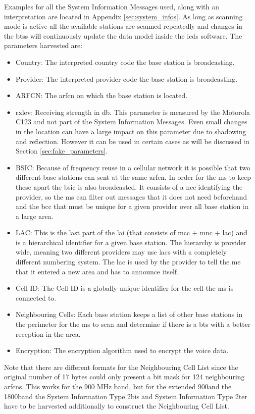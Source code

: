 Examples for all the System Information Messages used, along with an interpretation are located in Appendix \ref{sec:system_infos}.
As long as scanning mode is active all the available stations are scanned repeatedly and changes in the \glspl{bts} will continuously update the data model inside the \gls{icds} software.
The parameters harvested are:
\begin{itemize}
	\item Country: The interpreted country code the base station is broadcasting.
	\item Provider: The interpreted provider code the base station is broadcasting.
	\item ARFCN: The \gls{arfcn} on which the base station is located.
	\item rxlev: Receiving strength in db.
	This parameter is measured by the Motorola C123 and not part of the System Information Messages.
	Even small changes in the location can have a large impact on this parameter due to shadowing and reflection.
	However it can be used in certain cases as will be discussed in Section \ref{sec:fake_parameters}.
	\item BSIC: Because of frequency reuse in a cellular network it is possible that two different base stations can sent at the same \gls{arfcn}.
	In order for the \gls{ms} to keep these apart the \gls{bsic} is also broadcasted.
	It consists of a \gls{ncc} identifying the provider, so the \gls{ms} can filter out messages that it does not need beforehand and the \gls{bcc} that must be unique for a given provider over all base station in a large area.
	\item LAC: This is the last part of the \gls{lai} (that consists of \gls{mcc} + \gls{mnc} + \gls{lac}) and is a hierarchical identifier for a given base station.
	The hierarchy is provider wide, meaning two different providers may use \glspl{lac} with a completely different numbering system.
	The \gls{lac} is used by the provider to tell the \gls{me} that it entered a new area and has to announce itself.
	\item Cell ID: The Cell ID is a globally unique identifier for the cell the \gls{ms} is connected to.
	\item Neighbouring Cells: Each base station keeps a list of other base stations in the perimeter  for the \gls{ms} to scan and determine if there is a \gls{bts} with a better reception in the area.
	\item Encryption: The encryption algorithm used to encrypt the voice data.
\end{itemize}
Note that there are different formats for the Neighbouring Cell List since the original number of 17 bytes could only present a bit mask for 124 neighbouring \glspl{arfcn}.
This works for the 900 MHz band, but for the extended 900\MHz and the 1800\MHz band the System Information Type 2bis and System Information Type 2ter have to be harvested additionally to construct the Neighbouring Cell List.

